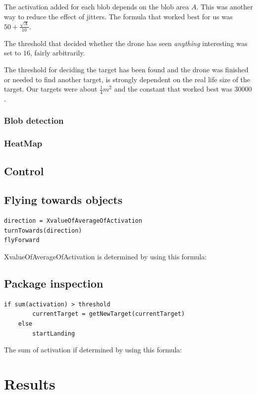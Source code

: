 \documentclass[a4paper,10pt]{article}
\begin{document}
The activation added for each blob depends on the blob area $A$. This was
another way to reduce the effect of jitters. The formula
that worked best for us was $50 + \frac{\sqrt{A}}{10}$.

The threshold that decided whether the drone has seen \emph{anything}
interesting was set to $16$, fairly arbitrarily.

The threshold for deciding the target has been found and the drone was
finished or needed to find another target, is strongly dependent on the
real life size of the target. Our targets were about $\frac{1}{4} m^2$
and the constant that worked best was $30 000$.


\subsubsection{Blob detection}

\subsubsection{HeatMap}

\subsection{Control}

\subsection{Flying towards objects\label{flytowards}}
\begin{verbatim}
direction = XvalueOfAverageOfActivation
turnTowards(direction)
flyForward
\end{verbatim}
XvalueOfAverageOfActivation is determined by using this formula:

\subsection{Package inspection\label{sec:packageinspection}}
\begin{verbatim}
if sum(activation) > threshold
        currentTarget = getNewTarget(currentTarget)
    else
        startLanding
\end{verbatim}
The sum of activation if determined by using this formula:


\section{Results}
\end{document}
